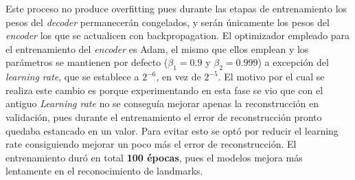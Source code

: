             \noindent Este proceso no produce overfitting pues durante las etapas de entrenamiento los pesos del \textit{decoder} permanecerán congelados, y serán únicamente los pesos del \textit{encoder} los que se actualicen con backpropagation. El optimizador empleado para el entrenamiento del \textit{encoder} es Adam, el mismo que ellos emplean y los parámetros se mantienen por defecto ($\beta_1=0.9$ y $\beta_2=0.999$) a excepción del \textit{learning rate}, que se establece a $2^{-6}$, en vez de $2^{-5}$. El motivo por el cual se realiza este cambio es porque experimentando en esta fase se vio que con el antiguo \textit{Learning rate} no se conseguía mejorar apenas la reconstrucción en validación, pues durante el entrenamiento el error de reconstrucción pronto quedaba estancado en un valor. Para evitar esto se optó por reducir el learning rate consiguiendo mejorar un poco más el error de reconstrucción. El entrenamiento duró en total \textbf{100 épocas}, pues el modelos mejora más lentamente en el reconocimiento de landmarks.

